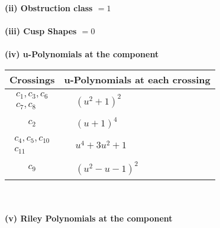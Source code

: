 \documentclass[1p]{elsarticle_modified}
\theoremstyle{definition}
\begin{document}
\flushleft \textbf{(ii) Obstruction class $= 1$}\\~\\
\flushleft \textbf{(iii) Cusp Shapes $= 0$}\\~\\
\newpage\renewcommand{\arraystretch}{1}
\flushleft \textbf{(iv) u-Polynomials at the component}\newline \\
\begin{tabular}{m{50pt}|m{274pt}}
Crossings & \hspace{64pt}u-Polynomials at each crossing \\
\hline $$\begin{aligned}c_{1},c_{3},c_{6}\\c_{7},c_{8}\end{aligned}$$&$\begin{aligned}
&(u^2+1)^2
\end{aligned}$\\
\hline $$\begin{aligned}c_{2}\end{aligned}$$&$\begin{aligned}
&(u+1)^4
\end{aligned}$\\
\hline $$\begin{aligned}c_{4},c_{5},c_{10}\\c_{11}\end{aligned}$$&$\begin{aligned}
&u^4+3 u^2+1
\end{aligned}$\\
\hline $$\begin{aligned}c_{9}\end{aligned}$$&$\begin{aligned}
&(u^2- u-1)^2
\end{aligned}$\\
\hline
\end{tabular}\\~\\
\newpage\renewcommand{\arraystretch}{1}
\flushleft \textbf{(v) Riley Polynomials at the component}\newline \\
\end{document}
